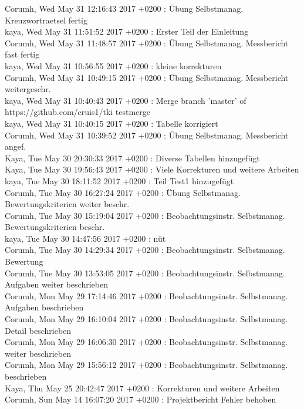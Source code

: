 Corumh, Wed May 31 12:16:43 2017 +0200 : Übung Selbstmanag. Kreuzwortraetsel fertig\\
kaya, Wed May 31 11:51:52 2017 +0200 : Erster Teil der Einleitung\\
Corumh, Wed May 31 11:48:57 2017 +0200 : Übung Selbstmanag. Messbericht fast fertig\\
kaya, Wed May 31 10:56:55 2017 +0200 : kleine korrekturen\\
Corumh, Wed May 31 10:49:15 2017 +0200 : Übung Selbstmanag. Messbericht weitergeschr.\\
kaya, Wed May 31 10:40:43 2017 +0200 : Merge branch 'master' of https://github.com/cruis1/tki testmerge\\
kaya, Wed May 31 10:40:15 2017 +0200 : Tabelle korrigiert\\
Corumh, Wed May 31 10:39:52 2017 +0200 : Übung Selbstmanag. Messbericht angef.\\
Kaya, Tue May 30 20:30:33 2017 +0200 : Diverse Tabellen hinzugefügt\\
Kaya, Tue May 30 19:56:43 2017 +0200 : Viele Korrekturen und weitere Arbeiten\\
kaya, Tue May 30 18:11:52 2017 +0200 : Teil Test1 hinzugefügt\\
Corumh, Tue May 30 16:27:24 2017 +0200 : Übung Selbstmanag. Bewertungskriterien weiter beschr.\\
Corumh, Tue May 30 15:19:04 2017 +0200 : Beobachtungsinstr. Selbstmanag. Bewertungskriterien beschr.\\
kaya, Tue May 30 14:47:56 2017 +0200 : nüt\\
Corumh, Tue May 30 14:29:34 2017 +0200 : Beobachtungsinstr. Selbstmanag. Bewertung\\
Corumh, Tue May 30 13:53:05 2017 +0200 : Beobachtungsinstr. Selbstmanag. Aufgaben weiter beschrieben\\
Corumh, Mon May 29 17:14:46 2017 +0200 : Beobachtungsinstr. Selbstmanag. Aufgaben beschrieben\\
Corumh, Mon May 29 16:10:04 2017 +0200 : Beobachtungsinstr. Selbstmanag. Detail beschrieben\\
Corumh, Mon May 29 16:06:30 2017 +0200 : Beobachtungsinstr. Selbstmanag. weiter beschrieben\\
Corumh, Mon May 29 15:56:12 2017 +0200 : Beobachtungsinstr. Selbstmanag. beschrieben\\
Kaya, Thu May 25 20:42:47 2017 +0200 : Korrekturen und weitere Arbeiten\\
Corumh, Sun May 14 16:07:20 2017 +0200 : Projektbericht Fehler behoben\\
